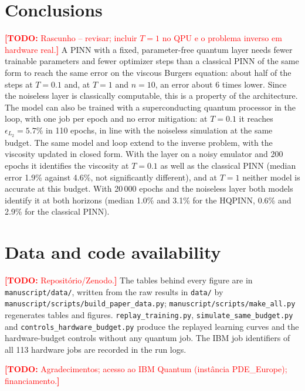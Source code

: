 \documentclass[floatfix,aps,pra,twocolumn,superscriptaddress,10pt,nofootinbib]{revtex4-2}
\newif\ifshowtodos \showtodostrue
\newcommand{\TODO}[1]{\ifshowtodos\textcolor{red}{\textbf{[TODO:} #1\textbf{]}}\fi}
\begin{document}
\section{Conclusions}\label{sec:conclusions}
\TODO{Rascunho -- revisar; incluir $T=1$ no QPU e o problema inverso em hardware real.} A PINN with a fixed, parameter-free quantum layer needs fewer trainable parameters and fewer optimizer steps than a classical PINN of the same form to reach the same error on the viscous Burgers equation: about half of the steps at $T=0.1$ and, at $T=1$ and $n=10$, an error about 6 times lower. Since the noiseless layer is classically computable, this is a property of the architecture. The model can also be trained with a superconducting quantum processor in the loop, with one job per epoch and no error mitigation: at $T=0.1$ it reaches $\epsilon_{L_2}=5.7\%$ in 110 epochs, in line with the noiseless simulation at the same budget. The same model and loop extend to the inverse problem, with the viscosity updated in closed form. With the layer on a noisy emulator and 200 epochs it identifies the viscosity at $T=0.1$ as well as the classical PINN (median error 1.9\% against 4.6\%, not significantly different), and at $T=1$ neither model is accurate at this budget. With 20\,000 epochs and the noiseless layer both models identify it at both horizons (median 1.0\% and 3.1\% for the HQPINN, 0.6\% and 2.9\% for the classical PINN).

\section*{Data and code availability}\label{sec:data}
\TODO{Reposit\'orio/Zenodo.} The tables behind every figure are in \texttt{manuscript/data/}, written from the raw results in \texttt{data/} by \texttt{manuscript/scripts/build\_paper\_data.py}; \texttt{manuscript/scripts/make\_all.py} regenerates tables and figures. \texttt{replay\_training.py}, \texttt{simulate\_same\_budget.py} and \texttt{controls\_hardware\_budget.py} produce the replayed learning curves and the hardware-budget controls without any quantum job. The IBM job identifiers of all 113 hardware jobs are recorded in the run logs.

\begin{acknowledgments}
\TODO{Agradecimentos; acesso ao IBM Quantum (inst\^ancia PDE\_Europe); financiamento.}
\end{acknowledgments}
\end{document}
